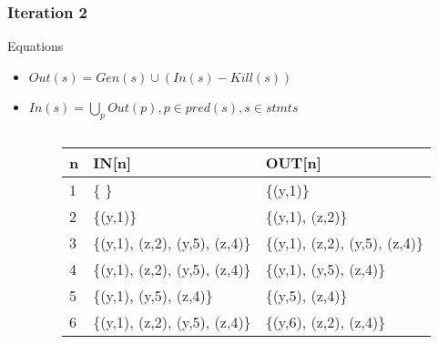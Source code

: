 \begin{frame}[fragile, t]
	\frametitle{Iteration 2} 
	
	\begin{center}
		\begin{scriptsize}
			\begin{minipage}{8cm}
				\begin{block}{Equations}
					\begin{itemize}
						\item $Out(s) = Gen(s) \cup (In(s) - Kill(s))$  
						\item $In(s) = \bigcup_p Out(p), p \in pred(s), s \in stmts$
					\end{itemize}
				\end{block}
			\end{minipage}
		\end{scriptsize}
	\end{center}
	
	\begin{columns}[T]
		\begin{column}[T]{.3\textwidth}
			\vspace{0pt}
			
		\end{column}
		\begin{column}[T]{.7\textwidth}
			\vspace{0pt}    
			\begin{scriptsize}
				\begin{table}[]
					\begin{tabular}{|l|l|l|}
						\hline
						n & IN{[}n{]} & OUT{[}n{]} \\ \hline
						1  & \{ \} & \{(y,1)\} \pause \\ \hline
						2  & \{(y,1)\} & \{(y,1), (z,2)\} \pause \\ \hline
						3  & \{(y,1), (z,2), (y,5), (z,4)\} & \{(y,1), (z,2), (y,5), (z,4)\} \pause \\ \hline
						4  & \{(y,1), (z,2), (y,5), (z,4)\} & \{(y,1), (y,5), (z,4)\} \pause \\ \hline
						5  & \{(y,1), (y,5), (z,4)\} & \{(y,5), (z,4)\} \pause \\ \hline
						6  & \{(y,1), (z,2), (y,5), (z,4)\} & \{(y,6), (z,2), (z,4)\} \\ \hline
					\end{tabular}
				\end{table}   
			\end{scriptsize}
		\end{column}
		
	\end{columns}
	
\end{frame}




